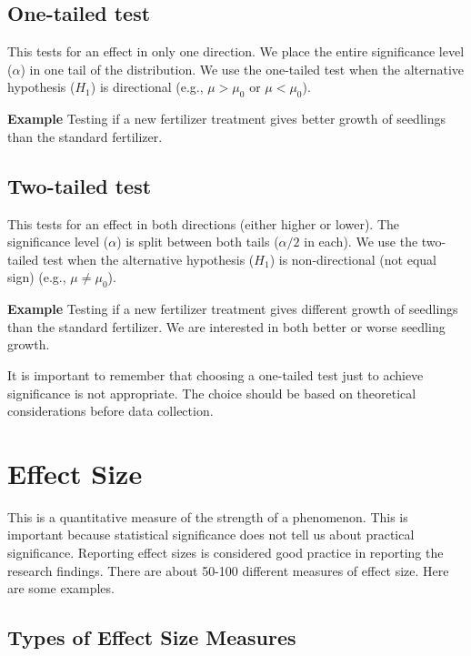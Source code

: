 \documentclass[
]{book}
\begin{document}
\subsection{One-tailed test}\label{one-tailed-test}

This tests for an effect in only one direction. We place the entire significance level (\(\alpha\)) in one tail of the distribution. We use the one-tailed test when the alternative hypothesis (\(H_1\)) is directional (e.g., \(\mu > \mu_0\) or \(\mu < \mu_0\)).

\textbf{Example} Testing if a new fertilizer treatment gives better growth of seedlings than the standard fertilizer.

\subsection{Two-tailed test}\label{two-tailed-test}

This tests for an effect in both directions (either higher or lower). The significance level (\(\alpha\)) is split between both tails (\(\alpha/2\) in each). We use the two-tailed test when the alternative hypothesis (\(H_1\)) is non-directional (not equal sign) (e.g., \(\mu \neq \mu_0\)).

\textbf{Example} Testing if a new fertilizer treatment gives different growth of seedlings than the standard fertilizer. We are interested in both better or worse seedling growth.

It is important to remember that choosing a one-tailed test just to achieve significance is not appropriate. The choice should be based on theoretical considerations before data collection.

\section{Effect Size}\label{effect-size}

This is a quantitative measure of the strength of a phenomenon. This is important because statistical significance does not tell us about practical significance. Reporting effect sizes is considered good practice in reporting the research findings. There are about 50-100 different measures of effect size. Here are some examples.

\subsection{Types of Effect Size Measures}\label{types-of-effect-size-measures}
\end{document}
